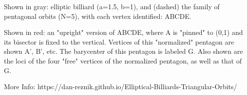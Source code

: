 Shown in gray: elliptic billiard (a=1.5, b=1), and (dashed) the family of pentagonal orbits (N=5), with each vertex identified: ABCDE.

Shown in red: an "upright" version of ABCDE, where A is "pinned" to (0,1) and its bisector is fixed to the vertical. Vertices of this "normalized" pentagon are shown A', B', etc. The barycenter of this pentagon is labeled G. Also shown are the loci of the four "free" vertices of the normalized pentagon, as well as that of G.

More Info: https://dan-reznik.github.io/Elliptical-Billiards-Triangular-Orbits/